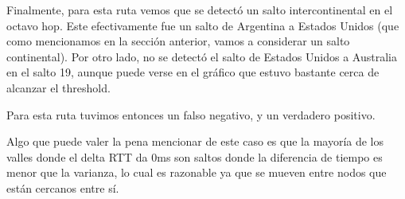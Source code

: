 Finalmente, para esta ruta vemos que se detectó un salto intercontinental en el octavo hop. Este efectivamente fue un salto de Argentina a Estados Unidos (que como mencionamos en la sección anterior, vamos a considerar un salto continental). Por otro lado, no se detectó el salto de Estados Unidos a Australia en el salto 19, aunque puede verse en el gráfico que estuvo bastante cerca de alcanzar el threshold.

Para esta ruta tuvimos entonces un falso negativo, y un verdadero positivo.

Algo que puede valer la pena mencionar de este caso es que la mayoría de los valles donde el delta RTT da 0ms son saltos donde la diferencia de tiempo es menor que la varianza, lo cual es razonable ya que se mueven entre nodos que están cercanos entre sí.
